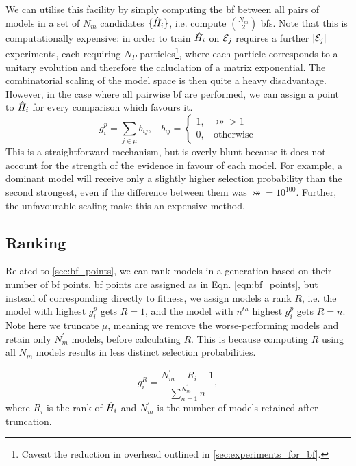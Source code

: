 We can utilise this facility by simply computing the \gls{bf} between all 
    pairs of models in a set of $N_m$ candidates $\{\hat{H}_i\}$, 
    i.e. compute ${N_m \choose 2}$ \gls{bf}s. 
Note that this is computationally expensive: 
    in order to train $\hat{H}_i$ on ${ \mathcal{E} }_j$ requires a further $\left| { \mathcal{E} }_j \right|$ experiments, 
    each requiring $N_P$ particles\footnote{Caveat the reduction in overhead outlined in \cref{sec:experiments_for_bf}.}, 
    where each particle corresponds to a unitary evolution and therefore the caluclation of a matrix exponential. 
The combinatorial scaling of the \gls{model space} is then quite a heavy disadvantage. 
However, in the case where all pairwise \gls{bf} are performed, 
    we can assign a point to $\hat{H}_i$ for every comparison which favours it. 
\begin{equation}
    \label{eqn:bf_points}
    g_i^p = \sum_{j \in \mu} b_{ij}, \ \ \ \ b_{ij} = 
        \begin{cases}
            1, \ \ \ \ \bij > 1 \\
            0, \ \ \ \ \text{otherwise}
        \end{cases}
\end{equation}
This is a straightforward mechanism, but is overly blunt
    because it does not account for the strength of the evidence
    in favour of each model. 
For example, a dominant model will receive only a slightly higher selection probability 
    than the second strongest, even if the difference between them was $\bij = 10^{100}$. 
Further, the unfavourable scaling make this an expensive method. 

\subsection{Ranking}\label{sec:bf_ranking}
Related to \cref{sec:bf_points}, we can rank models in a generation based on their number of \gls{bf} points.
\gls{bf} points are assigned as in Eqn. \ref{eqn:bf_points}, 
    but instead of corresponding directly to fitness, 
    we assign models a rank $R$, 
    i.e. the model with highest $g_i^p$ gets $R=1$, 
    and the model with $n^{th}$ highest $g_i^p$ gets $R=n$. 
Note here we truncate $\mu$, meaning we remove the worse-performing models and retain only $N_m^{\prime}$ models, 
    before calculating $R$.
This is because computing $R$ using all $N_m$ models results in less distinct selection probabilities. 

\begin{equation}
    \label{eqn:ranking}
    g_i^R = \frac{N_m^{\prime}-R_i+1}{\sum\limits_{n=1}^{N^{\prime}_m} n},
\end{equation}
    where $R_i$ is the rank of $\hat{H}_i$ and $N_m^{\prime}$ is the number of models retained after truncation. 


